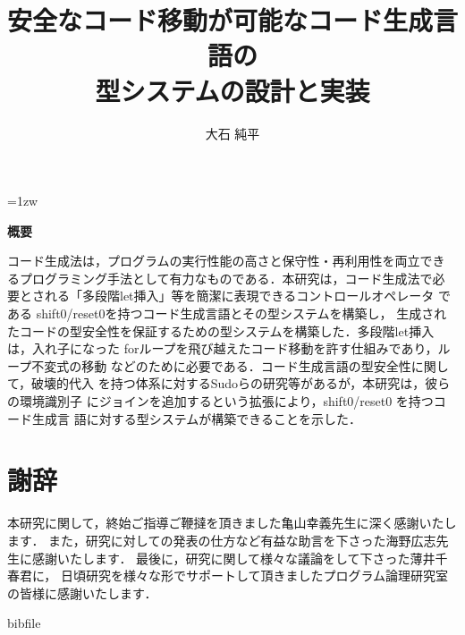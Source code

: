 \documentclass[a4paper,11pt]{jreport}
\title{安全なコード移動が可能なコード生成言語の\\型システムの設計と実装}
\author{大石 純平}
\begin{document}
\maketitle
\thispagestyle{empty}
\newpage

\thispagestyle{empty}
\vspace*{20pt plus 1fil}
\parindent=1zw
\noindent
\begin{center}
  {\bf 概要}
  \vspace{5mm}
\end{center}
コード生成法は，プログラムの実行性能の高さと保守性・再利用性を両立でき
るプログラミング手法として有力なものである．本研究は，コード生成法で必
要とされる「多段階let挿入」等を簡潔に表現できるコントロールオペレータ
である shift0/reset0を持つコード生成言語とその型システムを構築し，
生成されたコードの型安全性を保証するための型システムを構築した．多段階let挿入は，入れ子になった
forループを飛び越えたコード移動を許す仕組みであり，ループ不変式の移動
などのために必要である．コード生成言語の型安全性に関して，破壊的代入
を持つ体系に対するSudoらの研究等があるが，本研究は，彼らの環境識別子
にジョインを追加するという拡張により，shift0/reset0 を持つコード生成言
語に対する型システムが構築できることを示した．

\par
\vspace{0pt plus 1fil}
\newpage

\tableofcontents
\listoffigures

\pagebreak \setcounter{page}{1}







% 
% 


\chapter*{謝辞}
本研究に関して，終始ご指導ご鞭撻を頂きました亀山幸義先生に深く感謝いたします．
また，研究に対しての発表の仕方など有益な助言を下さった海野広志先生に感謝いたします．
最後に，研究に関して様々な議論をして下さった薄井千春君に，
日頃研究を様々な形でサポートして頂きましたプログラム論理研究室の皆様に感謝いたします．
\newpage

\renewcommand{\bibname}{参考文献}

\nocite{*}
 {bibfile}

\appendix

\end{document}
